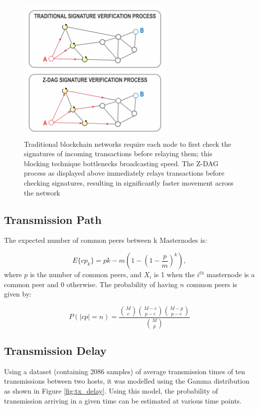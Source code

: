 \documentclass[peerreview]{ieeesyscoin}
\begin{document}
\begin{figure}[h!]
\includegraphics[width=3in]{img/dag_tx.png}
\caption{Traditional blockchain networks require each node to first check the signatures of incoming transactions before relaying them; this blocking technique bottlenecks broadcasting speed. The Z-DAG process as displayed above immediately relays transactions before checking signatures, resulting in significantly faster movement across the network} 
\label{fig:dag_tx}
\end{figure} 


\subsection{Transmission Path}

The expected number of common peers between k Masternodes is:

\begin{equation}
E\{cp_{k}\} = pk -m \left(1 - \left(1 - \frac{p}{m}\right)^{k}\right),
\end{equation}
where $p$ is the number of common peers, and $X_{i}$ is 1 when the $i^{th}$ masternode is a common peer and 0 otherwise. The probability of having $n$ common peers is given by: 

\begin{equation}
P(|cp| = n) = \frac{\binom{M}{c} \binom{M-c}{p-c} \binom{M-p}{p-c} }{\binom{M}{p}}
\end{equation}

\subsection{Transmission Delay}

Using a dataset (containing 2086 samples) of average transmission times of ten transmissions between two hosts, it was modelled using the Gamma distribution as shown in Figure \ref{fig:tx_delay}. Using this model, the probability of transmission arriving in a given time can be estimated at various time points.
\end{document}
